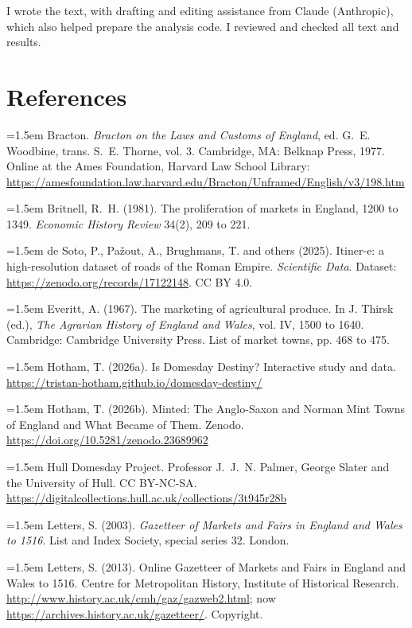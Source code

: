 \documentclass[11pt,a4paper]{article}
\begin{document}
I wrote the text, with drafting and editing assistance from Claude (Anthropic), which also helped prepare the analysis code. I reviewed and checked all text and results.

\section*{References}
\small
\setlength{\parskip}{0.35em}
\hangindent=1.5em Bracton. \textit{Bracton on the Laws and Customs of England}, ed. G.~E. Woodbine, trans. S.~E. Thorne, vol. 3. Cambridge, MA: Belknap Press, 1977. Online at the Ames Foundation, Harvard Law School Library: \url{https://amesfoundation.law.harvard.edu/Bracton/Unframed/English/v3/198.htm}

\hangindent=1.5em Britnell, R.~H. (1981). The proliferation of markets in England, 1200 to 1349. \textit{Economic History Review} 34(2), 209 to 221.

\hangindent=1.5em de Soto, P., Pa\v{z}out, A., Brughmans, T. and others (2025). Itiner-e: a high-resolution dataset of roads of the Roman Empire. \textit{Scientific Data}. Dataset: \url{https://zenodo.org/records/17122148}. CC BY 4.0.

\hangindent=1.5em Everitt, A. (1967). The marketing of agricultural produce. In J. Thirsk (ed.), \textit{The Agrarian History of England and Wales}, vol. IV, 1500 to 1640. Cambridge: Cambridge University Press. List of market towns, pp. 468 to 475.

\hangindent=1.5em Hotham, T. (2026a). Is Domesday Destiny? Interactive study and data. \url{https://tristan-hotham.github.io/domesday-destiny/}

\hangindent=1.5em Hotham, T. (2026b). Minted: The Anglo-Saxon and Norman Mint Towns of England and What Became of Them. Zenodo. \url{https://doi.org/10.5281/zenodo.23689962}

\hangindent=1.5em Hull Domesday Project. Professor J.~J.~N. Palmer, George Slater and the University of Hull. CC BY-NC-SA. \url{https://digitalcollections.hull.ac.uk/collections/3t945r28b}

\hangindent=1.5em Letters, S. (2003). \textit{Gazetteer of Markets and Fairs in England and Wales to 1516}. List and Index Society, special series 32. London.

\hangindent=1.5em Letters, S. (2013). Online Gazetteer of Markets and Fairs in England and Wales to 1516. Centre for Metropolitan History, Institute of Historical Research. \url{http://www.history.ac.uk/cmh/gaz/gazweb2.html}; now \url{https://archives.history.ac.uk/gazetteer/}. Copyright.
\end{document}
